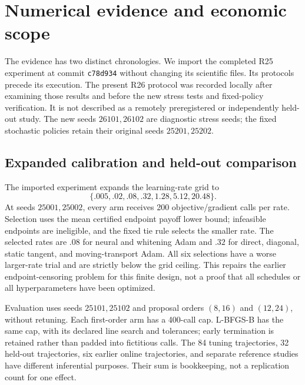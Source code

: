 \section{Numerical evidence and economic scope}\label{sec:evidence}
The evidence has two distinct chronologies. We import the completed R25 experiment at commit \texttt{c78d934} without changing its scientific files. Its protocols precede its execution. The present R26 protocol was recorded locally after examining those results and before the new stress tests and fixed-policy verification. It is not described as a remotely preregistered or independently held-out study. The new seeds $26101,26102$ are diagnostic stress seeds; the fixed stochastic policies retain their original seeds $25201,25202$.

\subsection{Expanded calibration and held-out comparison}\label{sec:calibration}
The imported experiment expands the learning-rate grid to
\[
 \{.005,.02,.08,.32,1.28,5.12,20.48\}.
\]
At seeds $25001,25002$, every arm receives 200 objective/gradient calls per rate. Selection uses the mean certified endpoint payoff lower bound; infeasible endpoints are ineligible, and the fixed tie rule selects the smaller rate. The selected rates are $.08$ for neural and whitening Adam and $.32$ for direct, diagonal, static tangent, and moving-transport Adam. All six selections have a worse larger-rate trial and are strictly below the grid ceiling. This repairs the earlier endpoint-censoring problem for this finite design, not a proof that all schedules or all hyperparameters have been optimized.

Evaluation uses seeds $25101,25102$ and proposal orders $(8,16)$ and $(12,24)$, without retuning. Each first-order arm has a 400-call cap. L-BFGS-B has the same cap, with its declared line search and tolerances; early termination is retained rather than padded into fictitious calls. The 84 tuning trajectories, 32 held-out trajectories, six earlier online trajectories, and separate reference studies have different inferential purposes. Their sum is bookkeeping, not a replication count for one effect.

